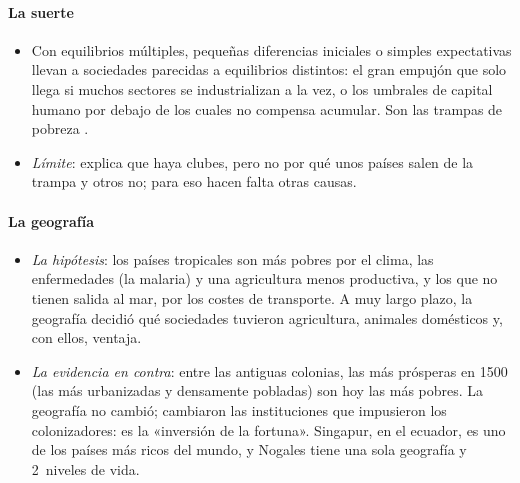 \documentclass[11pt]{article}
\begin{document}
\begin{infografia}[H]
\centering
\caption{De las causas últimas a las próximas y a la renta por habitante}\label{figu:causas}
\end{infografia}
\paragraph{La suerte}

\begin{itemize}
\item Con equilibrios múltiples, pequeñas diferencias iniciales o simples expectativas llevan a sociedades parecidas a equilibrios distintos: el gran empujón que solo llega si muchos sectores se industrializan a la vez\nocite{MurphyShleiferVishny1989Industrialization}, o los umbrales de capital humano por debajo de los cuales no compensa acumular\nocite{AzariadisDrazen1990}. Son las trampas de pobreza  .
\item \emph{Límite}: explica que haya clubes, pero no por qué unos países salen de la trampa y otros no; para eso hacen falta otras causas.
\end{itemize}

\paragraph{La geografía}

\begin{itemize}
\item \emph{La hipótesis}: los países tropicales son más pobres por el clima, las enfermedades (la malaria) y una agricultura menos productiva, y los que no tienen salida al mar, por los costes de transporte\nocite{GallupSachsMellinger1999}. A muy largo plazo, la geografía decidió qué sociedades tuvieron agricultura, animales domésticos y, con ellos, ventaja\nocite{Diamond1997}.
\item \emph{La evidencia en contra}: entre las antiguas colonias, las más prósperas en 1500 (las más urbanizadas y densamente pobladas) son hoy las más pobres. La geografía no cambió; cambiaron las instituciones que impusieron los colonizadores: es la «inversión de la fortuna»\nocite{AcemogluJohnsonRobinson2002Reversal}. Singapur, en el ecuador, es uno de los países más ricos del mundo, y Nogales tiene una sola geografía y 2~niveles de vida.
\end{itemize}
\end{document}

